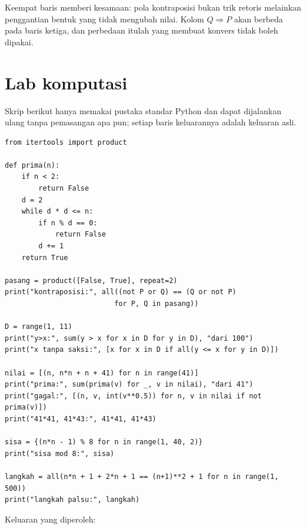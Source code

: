 Keempat baris memberi kesamaan: pola kontraposisi bukan trik retoris melainkan penggantian
bentuk yang tidak mengubah nilai. Kolom $Q \Rightarrow P$ akan berbeda pada baris ketiga,
dan perbedaan itulah yang membuat konvers tidak boleh dipakai.


\section{Lab komputasi}

Skrip berikut hanya memakai pustaka standar Python dan dapat dijalankan ulang tanpa
pemasangan apa pun; setiap baris keluarannya adalah keluaran asli.

\begin{lab}
\begin{verbatim}
from itertools import product

def prima(n):
    if n < 2:
        return False
    d = 2
    while d * d <= n:
        if n % d == 0:
            return False
        d += 1
    return True

pasang = product([False, True], repeat=2)
print("kontraposisi:", all((not P or Q) == (Q or not P)
                          for P, Q in pasang))

D = range(1, 11)
print("y>x:", sum(y > x for x in D for y in D), "dari 100")
print("x tanpa saksi:", [x for x in D if all(y <= x for y in D)])

nilai = [(n, n*n + n + 41) for n in range(41)]
print("prima:", sum(prima(v) for _, v in nilai), "dari 41")
print("gagal:", [(n, v, int(v**0.5)) for n, v in nilai if not prima(v)])
print("41*41, 41*43:", 41*41, 41*43)

sisa = {(n*n - 1) % 8 for n in range(1, 40, 2)}
print("sisa mod 8:", sisa)

langkah = all(n*n + 1 + 2*n + 1 == (n+1)**2 + 1 for n in range(1, 500))
print("langkah palsu:", langkah)
\end{verbatim}
\end{lab}

Keluaran yang diperoleh:

